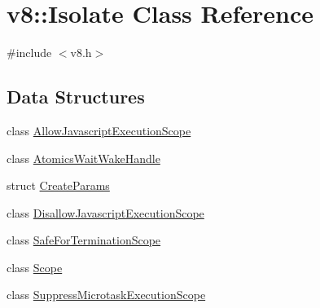 \hypertarget{classv8_1_1Isolate}{}\section{v8\+:\+:Isolate Class Reference}
\label{classv8_1_1Isolate}


{\ttfamily \#include $<$v8.\+h$>$}

\subsection*{Data Structures}
\begin{DoxyCompactItemize}
\item 
class \mbox{\hyperlink{classv8_1_1Isolate_1_1AllowJavascriptExecutionScope}{Allow\+Javascript\+Execution\+Scope}}
\item 
class \mbox{\hyperlink{classv8_1_1Isolate_1_1AtomicsWaitWakeHandle}{Atomics\+Wait\+Wake\+Handle}}
\item 
struct \mbox{\hyperlink{structv8_1_1Isolate_1_1CreateParams}{Create\+Params}}
\item 
class \mbox{\hyperlink{classv8_1_1Isolate_1_1DisallowJavascriptExecutionScope}{Disallow\+Javascript\+Execution\+Scope}}
\item 
class \mbox{\hyperlink{classv8_1_1Isolate_1_1SafeForTerminationScope}{Safe\+For\+Termination\+Scope}}
\item 
class \mbox{\hyperlink{classv8_1_1Isolate_1_1Scope}{Scope}}
\item 
class \mbox{\hyperlink{classv8_1_1Isolate_1_1SuppressMicrotaskExecutionScope}{Suppress\+Microtask\+Execution\+Scope}}
\end{DoxyCompactItemize}
